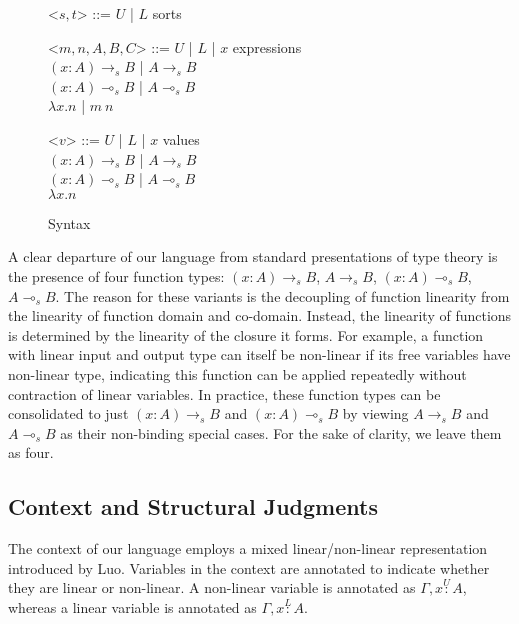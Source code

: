 \documentclass{article}
\newcommand{\indalt}[1][2]{\\\hspace*{-1.2em}\textbar\quad}
\newcommand{\utype}{\overset{U}{:}}
\newcommand{\ltype}{\overset{L}{:}}
\begin{document}
  \begin{figure}[H]
    \caption{Syntax}
    \centering
    \begin{minipage}{0.8\linewidth}
    \begin{grammar}
      <$s, t$> ::= $U$ | $L$ \phantom{| $x$} \hspace*{8em} sorts

      <$m, n, A, B, C$> ::= $U$ | $L$ | $x$  \hspace*{8em} expressions
      \indalt $(x : A) \rightarrow_s B$ | $A \rightarrow_s B$
      \indalt $(x : A) \multimap_s B$ | $A \multimap_s B$
      \indalt $\lambda x. n$ | $m\ n$

      <$v$> ::= $U$ | $L$ | $x$ \hspace*{8em} values
      \indalt $(x : A) \rightarrow_s B$ | $A \rightarrow_s B$
      \indalt $(x : A) \multimap_s B$ | $A \multimap_s B$
      \indalt $\lambda x. n$
    \end{grammar}
    \end{minipage}
    \label{syntax}
  \end{figure}

  A clear departure of our language from standard presentations of type theory is the presence of four function types: $(x : A) \rightarrow_s B$, $A \rightarrow_s B$, $(x : A) \multimap_s B$, $A \multimap_s B$. The reason for these variants is the decoupling of function linearity from the linearity of function domain and co-domain. Instead, the linearity of functions is determined by the linearity of the closure it forms. For example, a function with linear input and output type can itself be non-linear if its free variables have non-linear type, indicating this function can be applied repeatedly without contraction of linear variables. In practice, these function types can be consolidated to just $(x : A) \rightarrow_s B$ and $(x : A) \multimap_s B$ by viewing $A \rightarrow_s B$ and $A \multimap_s B$ as their non-binding special cases. For the sake of clarity, we leave them as four.

  \subsection{Context and Structural Judgments}
  The context of our language employs a mixed linear/non-linear representation introduced by Luo\cite{luo}. Variables in the context are annotated to indicate whether they are linear or non-linear. A non-linear variable is annotated as $\Gamma, x \utype A$, whereas a linear variable is annotated as $\Gamma, x \ltype A$. 
  
\end{document}
